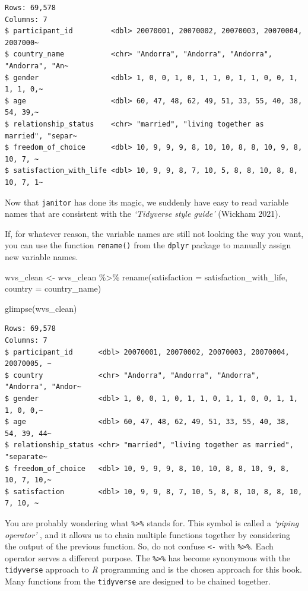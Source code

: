 \documentclass[
  letterpaper,
]{krantz}
\makeatletter
\newenvironment{Shaded}{\begin{snugshade}}{\end{snugshade}}
\newcommand{\AttributeTok}[1]{\textcolor[rgb]{0.40,0.45,0.13}{#1}}
\newcommand{\FunctionTok}[1]{\textcolor[rgb]{0.28,0.35,0.67}{#1}}
\newcommand{\NormalTok}[1]{\textcolor[rgb]{0.00,0.23,0.31}{#1}}
\newcommand{\OtherTok}[1]{\textcolor[rgb]{0.00,0.23,0.31}{#1}}
\newcommand{\SpecialCharTok}[1]{\textcolor[rgb]{0.37,0.37,0.37}{#1}}
\newenvironment{kframe}{%
\medskip{}
\setlength{\fboxsep}{.8em}
 \def\at@end@of@kframe{}%
 \ifinner\ifhmode%
  \def\at@end@of@kframe{\end{minipage}}%
  \begin{minipage}{\columnwidth}%
 \fi\fi%
 \def\FrameCommand##1{\hskip\@totalleftmargin \hskip-\fboxsep
 \colorbox{shadecolor}{##1}\hskip-\fboxsep
     \hskip-\linewidth \hskip-\@totalleftmargin \hskip\columnwidth}%
 \MakeFramed {\advance\hsize-\width
   \@totalleftmargin\z@ \linewidth\hsize
   \@setminipage}}%
 {\par\unskip\endMakeFramed%
 \at@end@of@kframe}
\renewenvironment{Shaded}{\begin{kframe}}{\end{kframe}}
\makeatother
\begin{document}
\begin{verbatim}
Rows: 69,578
Columns: 7
$ participant_id         <dbl> 20070001, 20070002, 20070003, 20070004, 2007000~
$ country_name           <chr> "Andorra", "Andorra", "Andorra", "Andorra", "An~
$ gender                 <dbl> 1, 0, 0, 1, 0, 1, 1, 0, 1, 1, 0, 0, 1, 1, 1, 0,~
$ age                    <dbl> 60, 47, 48, 62, 49, 51, 33, 55, 40, 38, 54, 39,~
$ relationship_status    <chr> "married", "living together as married", "separ~
$ freedom_of_choice      <dbl> 10, 9, 9, 9, 8, 10, 10, 8, 8, 10, 9, 8, 10, 7, ~
$ satisfaction_with_life <dbl> 10, 9, 9, 8, 7, 10, 5, 8, 8, 10, 8, 8, 10, 7, 1~
\end{verbatim}

Now that \texttt{janitor} has done its magic, we suddenly have easy to
read variable names that are consistent with the \emph{`Tidyverse style
guide'} (Wickham 2021).

If, for whatever reason, the variable names are still not looking the
way you want, you can use the function \texttt{rename()} from the
\texttt{dplyr} package to manually assign new variable names.

\begin{Shaded}
\begin{Highlighting}[]
\NormalTok{wvs\_clean }\OtherTok{\textless{}{-}} 
\NormalTok{  wvs\_clean }\SpecialCharTok{\%\textgreater{}\%}
  \FunctionTok{rename}\NormalTok{(}\AttributeTok{satisfaction =}\NormalTok{ satisfaction\_with\_life,}
         \AttributeTok{country =}\NormalTok{ country\_name)}

\FunctionTok{glimpse}\NormalTok{(wvs\_clean)}
\end{Highlighting}
\end{Shaded}

\begin{verbatim}
Rows: 69,578
Columns: 7
$ participant_id      <dbl> 20070001, 20070002, 20070003, 20070004, 20070005, ~
$ country             <chr> "Andorra", "Andorra", "Andorra", "Andorra", "Andor~
$ gender              <dbl> 1, 0, 0, 1, 0, 1, 1, 0, 1, 1, 0, 0, 1, 1, 1, 0, 0,~
$ age                 <dbl> 60, 47, 48, 62, 49, 51, 33, 55, 40, 38, 54, 39, 44~
$ relationship_status <chr> "married", "living together as married", "separate~
$ freedom_of_choice   <dbl> 10, 9, 9, 9, 8, 10, 10, 8, 8, 10, 9, 8, 10, 7, 10,~
$ satisfaction        <dbl> 10, 9, 9, 8, 7, 10, 5, 8, 8, 10, 8, 8, 10, 7, 10, ~
\end{verbatim}

You are probably wondering what \texttt{\%\textgreater{}\%} stands for.
This symbol is called a \emph{`piping operator'} , and it allows us to
chain multiple functions together by considering the output of the
previous function. So, do not confuse \texttt{\textless{}-} with
\texttt{\%\textgreater{}\%}. Each operator serves a different purpose.
The \texttt{\%\textgreater{}\%} has become synonymous with the
\texttt{tidyverse} approach to \emph{R} programming and is the chosen
approach for this book. Many functions from the \texttt{tidyverse} are
designed to be chained together.
\end{document}
